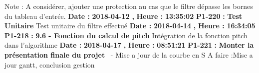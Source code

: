 \documentclass{article}%
\begin{document}
\newline%
\newline%
%
Note : A considérer, ajouter une protection au cas que le filtre dépasse les bornes du tableau d'entrée.\newline%
\newline%
%
\textbf{Date : }%
\textbf{2018{-}04{-}12}%
\textbf{,}%
\textbf{ Heure : }%
\textbf{13:35:02}%
\newline%
%
\textbf{P1{-}220 }%
\textbf{ : }%
\textbf{ Test Unitaire}%
\newline%
\newline%
%
Test unitaire du filtre effectué\newline%
\newline%
%
\textbf{Date : }%
\textbf{2018{-}04{-}14}%
\textbf{,}%
\textbf{ Heure : }%
\textbf{16:34:05}%
\newline%
%
\textbf{P1{-}218 }%
\textbf{ : }%
\textbf{ 9.6 {-} Fonction du calcul de pitch}%
\newline%
\newline%
%
Intégration de la fonction pitch dans l'algorithme\newline%
\newline%
%
\textbf{Date : }%
\textbf{2018{-}04{-}17}%
\textbf{,}%
\textbf{ Heure : }%
\textbf{08:51:21}%
\newline%
%
\textbf{P1{-}221 }%
\textbf{ : }%
\textbf{ Monter la présentation finale du projet }%
\newline%
\newline%
%
~{-} Mise a jour de la courbe en S\newline%
A faire :Mise a jour gantt, conclusion gestion\newline%
\newline%
%
\newpage

%
\end{document}
